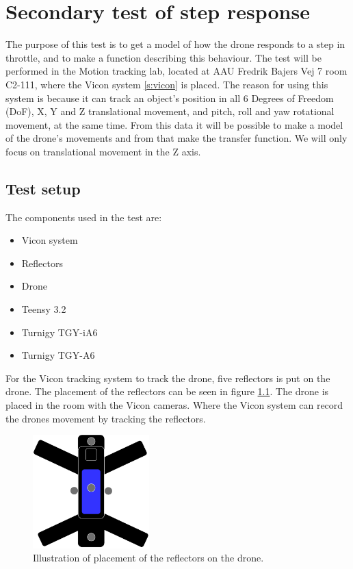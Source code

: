 \chapter{Secondary test of step response}\label{ap:drone_secondary_test}
The purpose of this test is to get a model of how the drone responds to a step in throttle, and to make a function describing this behaviour. The test will be performed in the Motion tracking lab, located at AAU Fredrik Bajers Vej 7 room C2-111, where the Vicon system \ref{s:vicon} is placed. The reason for using this system is because it can track an object's position in all 6 Degrees of Freedom (DoF), X, Y and Z translational movement, and pitch, roll and yaw rotational movement, at the same time. From this data it will be possible to make a model of the drone's movements and from that make the transfer function. We will only focus on translational movement in the Z axis.

\section*{Test setup}
The components used in the test are:
\begin{itemize}
    \item{Vicon system}
    \item{Reflectors}
    \item{Drone}
    \item{Teensy 3.2} %
    \item{Turnigy TGY-iA6} %
    \item{Turnigy TGY-A6} %
\end{itemize}
For the Vicon tracking system to track the drone, five reflectors is put on the drone. The placement of the reflectors can be seen in figure \ref{fig:reflectors_secondary}.
The drone is placed in the room with the Vicon cameras. Where the Vicon system can record the drones movement by tracking the reflectors. 

\begin{figure}[H]
    \centering
    \includegraphics[width=0.4\textwidth]{figures/Appendix/measuringTest/Reflector1.pdf}
    \caption{Illustration of placement of the reflectors on the drone.}
    \label{fig:reflectors_secondary}
\end{figure}

